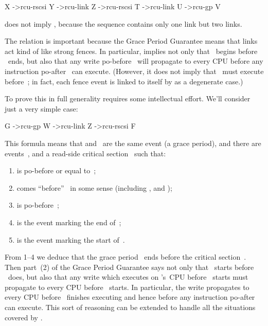 \begin{VerbatimU}
	X ->rcu-rscsi Y ->rcu-link Z ->rcu-rscsi T ->rcu-link U ->rcu-gp V
\end{VerbatimU}

\noindent%
does not imply , because the sequence contains only
one  link but two  links.

The  relation is important because the Grace Period Guarantee
means that  links act kind of like strong fences.
In particular,  implies not only that
~begins before ~ends, but also that any write po-before~
will propagate to every CPU before any instruction po-after~ can
execute.
(However, it does not imply that ~must execute before~;
in fact, each  fence event is linked to itself
by  as a degenerate case.)

To prove this in full generality requires some intellectual effort.
We'll consider just a very simple case:

\begin{VerbatimU}
	G ->rcu-gp W ->rcu-link Z ->rcu-rscsi F
\end{VerbatimU}

This formula means that  and~ are the same event (a grace period),
and there are events~,  and a read-side critical section~
such that:

\begin{enumerate}
\item	{} is po-before or equal to~;

\item	{} comes ``before''~ in some sense (including ,
	 and );

\item	{} is po-before~;

\item	{} is the  event marking the end of~;

\item	{} is the  event marking the start of~.
\end{enumerate}

From 1--4 we deduce that the grace period~ ends before the critical
section~.
Then part~(2) of the Grace Period Guarantee says not only that
~starts before ~does, but also that any write which executes on
's~CPU before ~starts must propagate to every CPU before
~starts.
In particular, the write propagates to every CPU before ~finishes
executing and hence before any instruction po-after~ can execute.
This sort of reasoning can be extended to handle all the situations
covered by .

